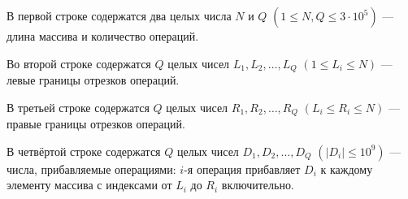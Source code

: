 В первой строке содержатся два целых числа $N$ и $Q$ $(1 \le N, Q \le 3 \cdot 10^5)$ --- длина массива и количество операций.

Во второй строке содержатся $Q$ целых чисел $L_1, L_2, \ldots, L_Q$ $(1 \le L_i \le N)$ --- левые границы отрезков операций.

В третьей строке содержатся $Q$ целых чисел $R_1, R_2, \ldots, R_Q$ $(L_i \le R_i \le N)$ --- правые границы отрезков операций.

В четвёртой строке содержатся $Q$ целых чисел $D_1, D_2, \ldots, D_Q$ $(|D_i| \le 10^9)$ --- числа, прибавляемые операциями: $i$-я операция прибавляет $D_i$ к каждому элементу массива с индексами от $L_i$ до $R_i$ включительно.
